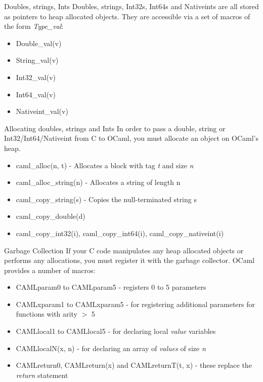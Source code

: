 \documentclass{beamer}
\begin{document}
\begin{frame}{Doubles, strings, Ints}
Doubles, strings, Int32s, Int64s and Nativeints are all stored as pointers to heap allocated objects.
They are accessible via a set of macros of the form \emph{Type\_val}:
\begin{itemize}
    \item Double\_val(v)
    \item String\_val(v)
    \item Int32\_val(v)
    \item Int64\_val(v)
    \item Nativeint\_val(v)
\end{itemize}
\end{frame}

\begin{frame}{Allocating doubles, strings and Ints}
In order to pass a double, string or Int32/Int64/Nativeint from C to OCaml, you must allocate an
object on OCaml's heap.
\begin{itemize}
    \item caml\_alloc(n, t) - Allocates a block with tag \emph{t} and size \emph{n}
    \item caml\_alloc\_string(n) - Allocates a string of length n
    \item caml\_copy\_string(s) - Copies the null-terminated string s
    \item caml\_copy\_double(d)
    \item caml\_copy\_int32(i), caml\_copy\_int64(i), caml\_copy\_nativeint(i)
\end{itemize}
\end{frame}

\begin{frame}{Garbage Collection}
If your C code manipulates any heap allocated objects or performs any allocations, you must
register it with the garbage collector.  OCaml provides a number of macros:
\begin{itemize}
    \item CAMLparam0 to CAMLparam5 - registers 0 to 5 parameters
    \item CAMLxparam1 to CAMLxparam5 - for registering additional parameters for functions with arity $>$ 5
    \item CAMLlocal1 to CAMLlocal5 - for declaring local \emph{value} variables
    \item CAMLlocalN(x, n) - for declaring an array of \emph{values} of size \emph{n}
    \item CAMLreturn0, CAMLreturn(x) and CAMLreturnT(t, x) - these replace the \emph{return} statement
\end{itemize}
\end{frame}
\end{document}
